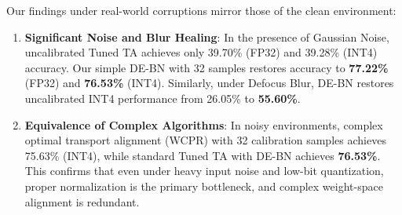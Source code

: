 \documentclass{article}
\theoremstyle{plain}
\theoremstyle{definition}
\theoremstyle{remark}
\begin{document}
Our findings under real-world corruptions mirror those of the clean environment:
\begin{enumerate}
    \item \textbf{Significant Noise and Blur Healing}: In the presence of Gaussian Noise, uncalibrated Tuned TA achieves only 39.70\% (FP32) and 39.28\% (INT4) accuracy. Our simple DE-BN with 32 samples restores accuracy to \textbf{77.22\%} (FP32) and \textbf{76.53\%} (INT4). Similarly, under Defocus Blur, DE-BN restores uncalibrated INT4 performance from 26.05\% to \textbf{55.60\%}.
    \item \textbf{Equivalence of Complex Algorithms}: In noisy environments, complex optimal transport alignment (WCPR) with 32 calibration samples achieves 75.63\% (INT4), while standard Tuned TA with DE-BN achieves \textbf{76.53\%}. This confirms that even under heavy input noise and low-bit quantization, proper normalization is the primary bottleneck, and complex weight-space alignment is redundant.
\end{enumerate}
\end{document}
